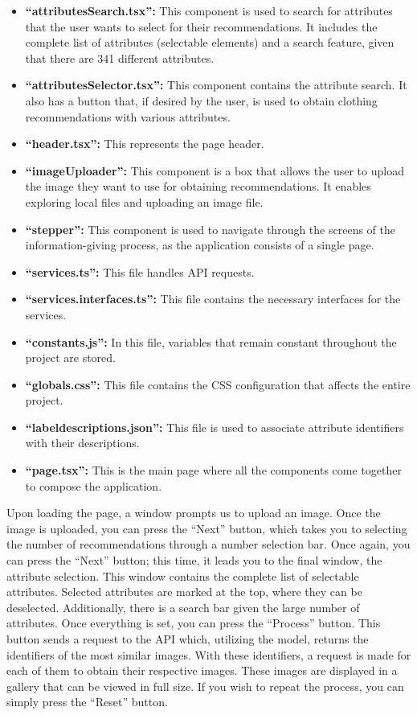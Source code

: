 \documentclass[12pt]{report} %
\begin{document}
\begin{itemize}
	\item \textbf{``attributesSearch.tsx'':} This component is used to search for attributes that the user wants to select for their recommendations. It includes the complete list of attributes (selectable elements) and a search feature, given that there are 341 different attributes.
	\item \textbf{``attributesSelector.tsx'':} This component contains the attribute search. It also has a button that, if desired by the user, is used to obtain clothing recommendations with various attributes.
	\item \textbf{``header.tsx'':} This represents the page header.
	\item \textbf{``imageUploader'':} This component is a box that allows the user to upload the image they want to use for obtaining recommendations. It enables exploring local files and uploading an image file.
	\item \textbf{``stepper'':} This component is used to navigate through the screens of the information-giving process, as the application consists of a single page.
	\item \textbf{``services.ts'':} This file handles API requests.
	\item \textbf{``services.interfaces.ts'':} This file contains the necessary interfaces for the services.
	\item \textbf{``constants.js'':} In this file, variables that remain constant throughout the project are stored.
	\item \textbf{``globals.css'':} This file contains the CSS configuration that affects the entire project.
	\item \textbf{``label\textunderscore descriptions.json'':} This file is used to associate attribute identifiers with their descriptions.
	\item \textbf{``page.tsx'':} This is the main page where all the components come together to compose the application.
\end{itemize}

Upon loading the page, a window prompts us to upload an image. Once the image is uploaded, you can press the ``Next'' button, which takes you to selecting the number of recommendations through a number selection bar. Once again, you can press the ``Next'' button; this time, it leads you to the final window, the attribute selection. This window contains the complete list of selectable attributes. Selected attributes are marked at the top, where they can be deselected. Additionally, there is a search bar given the large number of attributes. Once everything is set, you can press the ``Process'' button. This button sends a request to the API which, utilizing the model, returns the identifiers of the most similar images. With these identifiers, a request is made for each of them to obtain their respective images. These images are displayed in a gallery that can be viewed in full size. If you wish to repeat the process, you can simply press the ``Reset'' button.
\end{document}
